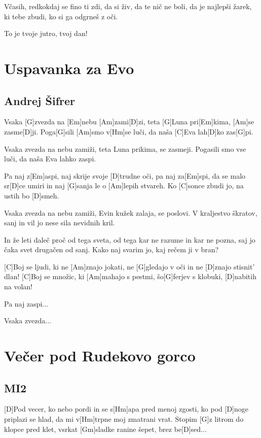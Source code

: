 \documentclass[a4paper,12pt]{article}
\begin{document}
\begin{multicols}{2}
\begin{guitar}
Včasih, redkokdaj 
se fino ti zdi, 
da si živ, 
da te nič ne boli, 
da je najlepši žarek, 
ki tebe zbudi, 
ko si ga odgrneš z oči. 


To je tvoje jutro, tvoj dan! 

\end{guitar}
\section{Uspavanka za Evo}
\subsection*{Andrej Šifrer}
\begin{guitar}

Vsaka [G]zvezda na [Em]nebu [Am]zami[D]zi, 
teta [G]Luna pri[Em]kima, [Am]se zasme[D]ji. 
Poga[G]sili [Am]smo v[Hm]se luči, 
da naša [C]Eva lah[D]ko zas[G]pi. 


Vsaka zvezda na nebu zamiži, 
teta Luna prikima, se zasmeji. 
Pogasili smo vse luči, 
da naša Eva lahko zaspi. 


Pa naj z[Em]aspi, naj skrije svoje [D]trudne oči, 
pa naj za[Em]spi, da se malo sr[D]ce umiri 
in naj [G]sanja le o [Am]lepih stvareh. 
Ko [C]sonce zbudi jo, na ustih bo [D]smeh. 


Vsaka zvezda na nebu zamiži, 
Evin kužek zalaja, se poslovi. 
V kraljestvo škratov, sanj in vil 
jo nese sila nevidnih  kril. 


In že leti daleč proč od tega sveta, 
od tega kar ne razume in kar ne pozna, 
saj jo čaka svet drugačen od sanj. 
Kako naj svarim jo, kaj rečem ji v bran? 


[C]Boj se ljudi, ki ne [Am]znajo jokati, 
ne [G]gledajo v oči in ne [D]znajo stisnit’ dlan! 
[C]Boj se množic, ki [Am]mahajo s pestmi, 
šo[G]ferjev s klobuki, [D]nabitih na volan! 


Pa naj zaspi... 


Vsaka zvezda...

\end{guitar}
\section{Večer pod Rudekovo gorco}
\subsection*{MI2}
\begin{guitar}
[D D7 G Gm]

[D]Pod vecer, ko nebo pordi
in se s[Hm]apa pred menoj zgosti,
ko pod [D]noge priplazi se hlad,
da mi v[Hm]trpne moj zmatrani vrat.
Stopim [G]z litrom do klopce pred klet,
vsrkat [Gm]sladke ranine šepet,
brez be[D]sed...



\end{guitar}
\end{multicols}
\end{document}
